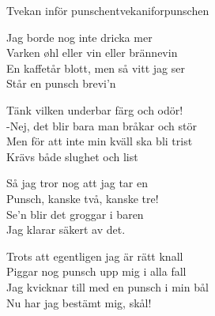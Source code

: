 \begin{song}{Tvekan inför punschen}{tvekaniforpunschen}
\begin{vers}
Jag borde nog inte dricka mer\\
Varken øhl eller vin eller brännevin\\
En kaffetår blott, men så vitt jag ser\\
Står en punsch brevi'n\\
\end{vers}
\begin{vers}
Tänk vilken underbar färg och odör!\\
-Nej, det blir bara man bråkar och stör\\
Men för att inte min kväll ska bli trist\\
Krävs både slughet och list\\
\end{vers}
\begin{vers}
Så jag tror nog att jag tar en\\
Punsch, kanske två, kanske tre!\\
Se'n blir det groggar i baren\\
Jag klarar säkert av det.
\end{vers}
\begin{vers}
Trots att egentligen jag är rätt knall\\
Piggar nog punsch upp mig i alla fall\\
Jag kvicknar till med en punsch i min bål\\
Nu har jag bestämt mig, skål!\\
\end{vers}
\end{song}
